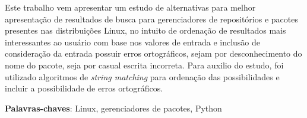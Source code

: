 \begin{resumo}

Este trabalho vem apresentar um estudo de alternativas para melhor apresentação de resultados de busca para gerenciadores de repositórios e pacotes presentes nas distribuições Linux, no intuito de ordenação de resultados mais interessantes ao usuário com base nos valores de entrada e inclusão de consideração da entrada possuir erros ortográficos, sejam por desconhecimento do nome do pacote, seja por casual escrita incorreta. Para auxilio do estudo, foi utilizado algoritmos de \textit{string matching} para ordenação das possibilidades e incluir a possibilidade de erros ortográficos.

 \vspace{\onelineskip}
    
 \noindent
 \textbf{Palavras-chaves}: Linux, gerenciadores de pacotes, Python
\end{resumo}
